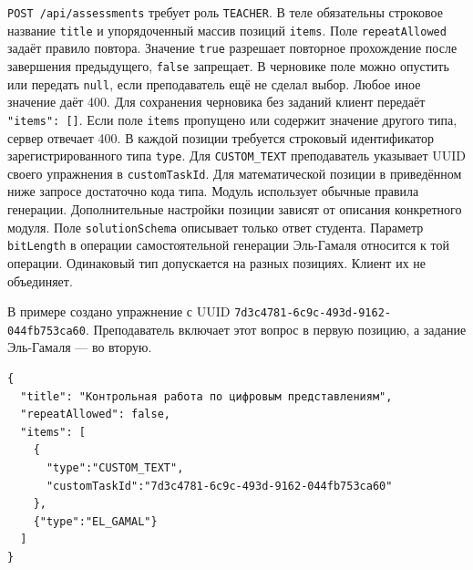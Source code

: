 \documentclass[12pt,a4paper]{article}
\begin{document}
\texttt{POST /\allowbreak{}api/\allowbreak{}assessments} требует роль \texttt{TEACHER}. В теле обязательны строковое название \texttt{title} и упорядоченный массив позиций \texttt{items}. Поле \texttt{repeat\allowbreak{}Allowed} задаёт правило повтора. Значение \texttt{true} разрешает повторное прохождение после завершения предыдущего, \texttt{false} запрещает. В черновике поле можно опустить или передать \texttt{null}, если преподаватель ещё не сделал выбор. Любое иное значение даёт 400. Для сохранения черновика без заданий клиент передаёт \texttt{"items":\ {[}{]}}. Если поле \texttt{items} пропущено или содержит значение другого типа, сервер отвечает 400. В каждой позиции требуется строковый идентификатор зарегистрированного типа \texttt{type}. Для \texttt{CUSTOM\_\allowbreak{}TEXT} преподаватель указывает UUID своего упражнения в \texttt{custom\allowbreak{}Task\allowbreak{}Id}. Для математической позиции в приведённом ниже запросе достаточно кода типа. Модуль использует обычные правила генерации. Дополнительные настройки позиции зависят от описания конкретного модуля. Поле \texttt{solution\allowbreak{}Schema} описывает только ответ студента. Параметр \texttt{bitLength} в операции самостоятельной генерации Эль-Гамаля относится к той операции. Одинаковый тип допускается на разных позициях. Клиент их не объединяет.

В примере создано упражнение с UUID \texttt{7d3c4781-\allowbreak{}6c9c-\allowbreak{}493d-\allowbreak{}9162-\allowbreak{}044fb753ca60}. Преподаватель включает этот вопрос в первую позицию, а задание Эль-Гамаля --- во вторую.

\begin{verbatim}
{
  "title": "Контрольная работа по цифровым представлениям",
  "repeatAllowed": false,
  "items": [
    {
      "type":"CUSTOM_TEXT",
      "customTaskId":"7d3c4781-6c9c-493d-9162-044fb753ca60"
    },
    {"type":"EL_GAMAL"}
  ]
}
\end{verbatim}
\end{document}
